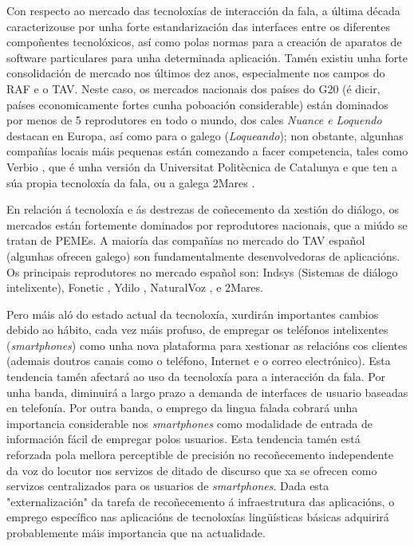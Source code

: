 \begin{multicols}{2}
Con respecto ao mercado das tecnoloxías de interacción da fala, a última década caracterizouse por unha forte estandarización das interfaces entre os diferentes compoñentes tecnolóxicos, así como polas normas para a creación de aparatos de software particulares para unha determinada aplicación. Tamén existiu unha forte consolidación de mercado nos últimos dez anos, especialmente nos campos do RAF e o TAV. Neste caso, os mercados nacionais dos países do G20 (é dicir, países economicamente fortes cunha poboación considerable) están dominados por menos de 5 reprodutores en todo o mundo, dos cales \textit{Nuance e Loquendo} destacan en Europa, así como para o galego (\textit{Loqueando}); non obstante, algunhas compañías locais máis pequenas están comezando a facer competencia, tales como Verbio \cite{GAL-Nota25} , que é unha versión da Universitat Politècnica de Catalunya e que ten a súa propia tecnoloxía da fala, ou a galega 2Mares \cite{GAL-Nota26}.

En relación á tecnoloxía e ás destrezas de coñecemento da xestión do diálogo, os mercados están fortemente dominados por reprodutores nacionais, que a miúdo se tratan de PEMEs.
A maioría das compañías no mercado do TAV español (algunhas ofrecen galego) son fundamentalmente desenvolvedoras de aplicacións. Os principais reprodutores no mercado español son: Indsys \cite{GAL-Nota27} (Sistemas de diálogo intelixente), Fonetic \cite{GAL-Nota28}, Ydilo \cite{GAL-Nota29}, NaturalVoz \cite{GAL-Nota30}, e 2Mares.

Pero máis aló do estado actual da tecnoloxía, xurdirán importantes cambios debido ao hábito, cada vez máis profuso, de empregar os teléfonos intelixentes (\textit{smartphones}) como unha nova plataforma para xestionar as relacións cos clientes (ademais doutros canais como o teléfono, Internet e o correo electrónico). Esta tendencia tamén afectará ao uso da tecnoloxía para a interacción da fala. Por unha banda, diminuirá a largo prazo a demanda de interfaces de usuario baseadas en telefonía. Por outra banda, o emprego da lingua falada cobrará unha importancia considerable nos \textit{smartphones} como modalidade de entrada de información fácil de empregar polos usuarios. Esta tendencia tamén está reforzada pola mellora perceptible de precisión no recoñecemento independente da voz do locutor nos servizos de ditado de discurso que xa se ofrecen como servizos centralizados para os usuarios de \textit{smartphones}. Dada esta "externalización" da tarefa de recoñecemento á infraestrutura das aplicacións, o emprego específico nas aplicacións de tecnoloxías lingüísticas básicas adquirirá probablemente máis importancia que na actualidade. 


\end{multicols}
